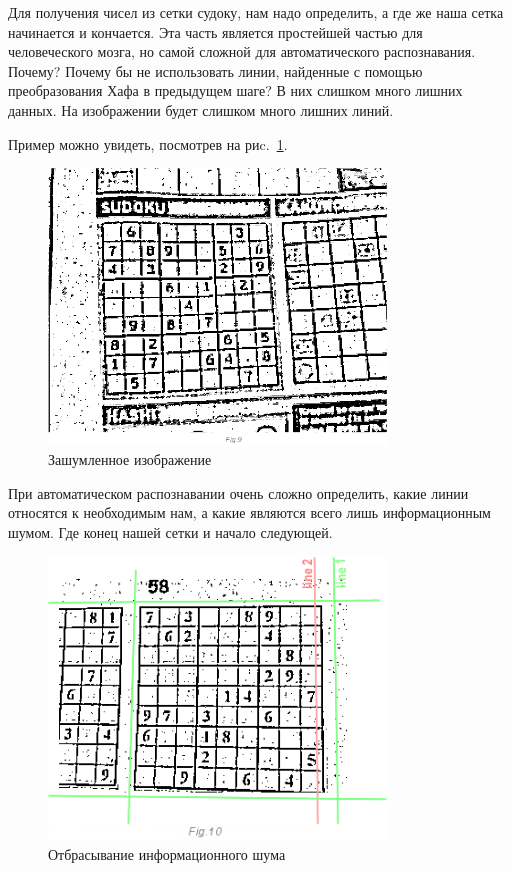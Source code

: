 Для получения чисел из сетки судоку, нам надо определить, а где же наша сетка начинается и кончается. Эта часть является простейшей частью для человеческого мозга, но самой сложной для автоматического распознавания. Почему? Почему бы не использовать линии, найденные с помощью преобразования Хафа в предыдущем шаге? В них слишком много лишних данных. На изображении будет слишком много лишних линий. 

Пример можно увидеть, посмотрев на риc.~\ref{fig:fig28}.
\begin{figure}[ht!]
  \centering
  \includegraphics[width=0.8\textwidth]{inc/raster/design2-8.png}
  \caption{Зашумленное изображение}
  \label{fig:fig28}
\end{figure}

При автоматическом распознавании очень сложно определить, какие линии относятся к необходимым нам, а какие являются всего лишь информационным шумом. Где конец нашей сетки и начало следующей.

\begin{figure}[ht!]
  \centering
  \includegraphics[width=0.8\textwidth]{inc/raster/design2-9.png}
  \caption{Отбрасывание информационного шума}
  \label{fig:fig29}
\end{figure}

